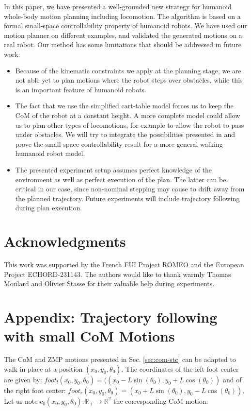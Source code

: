 \documentclass{article}
\begin{document}
In this paper, we have presented a well-grounded new strategy for humanoid whole-body
motion planning including locomotion. The algorithm is based on a formal
small-space controllability property of humanoid robots. 
We have used our motion planner on different examples, and validated the
generated motions on a real robot.
Our method has some limitations that should be addressed in future work:
\begin{itemize}
\item Because of the kinematic constraints we apply at the planning stage, we are not
  able yet to plan motions where the robot steps over obstacles, while this is an 
  important feature of humanoid robots.
\item The fact that we use the simplified cart-table model forces us to keep the CoM
  of the robot at a constant height. A more complete model could allow us to plan
  other types of locomotions, for example to allow the robot to pass under 
  obstacles. We will try to integrate the possibilities 
  presented in \cite{kanehiro2004locomotion} and prove the small-space controllability
  result for a more general walking humanoid robot model.
\item The presented experiment setup assumes perfect knowledge of the environment 
  as well as perfect execution of the plan. The latter can be critical in our case, since
  non-nominal stepping may cause to drift away from the planned trajectory. Future 
  experiments will  include trajectory following during plan execution.
\end{itemize}

\section{Acknowledgments}

This work was supported by the French FUI Project ROMEO and the European Project ECHORD-231143. 
The authors would like to thank warmly Thomas Moulard and Olivier Stasse for their valuable help during experiments.

\section*{Appendix: Trajectory following with small CoM Motions}


The  CoM  and ZMP  motions  presented in Sec. \ref{sec:com-stc} 
 can  be  adapted to  walk
in-place  at  a position  $(x_0,y_0,\theta_0)$. The coordinates  of the
left foot center are given by: 
$foot_l(x_0,y_0,\theta_0) = (\left( x_0 - L  \sin (\theta_0), y_0 + L \cos
(\theta_0)\right)$
and of the right foot center: 
$foot_r(x_0,y_0,\theta_0) = \left( x_0 + L  \sin (\theta_0), y_0 - L \cos
(\theta_0)\right)$. Let us  note $c_0(x_0,y_0,\theta_0) : \mathbb{R}_+
\rightarrow \mathbb{R}^2$ the corresponding CoM motion:
\end{document}
